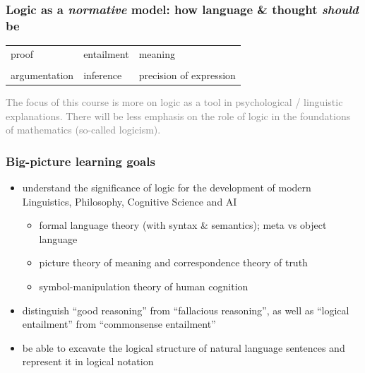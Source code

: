 \documentclass[fleqn,10pt,serif,xcolor=svgnames,xcolor=table,aspectratio=169,handout]{beamer}
\newcommand{\mygray}[1]{\textcolor{gray}{#1}}
\begin{document}
\begin{frame}
  \frametitle{Logic as a \textit{normative} model: how language \& thought \textit{should} be}

  \begin{center}
    \begin{Large}
      \begin{tabular}{C{4cm}C{4cm}C{4cm}}
        proof & entailment & meaning \\
              & \\
        argumentation & inference & precision of expression
      \end{tabular}
    \end{Large}
  \end{center}


  \bigskip

  \begin{center}
    \begin{footnotesize}
      \mygray{The focus of this course is more on logic as a tool in psychological / linguistic explanations. There will be less emphasis on the role of logic in the foundations of mathematics (so-called logicism).}
    \end{footnotesize}
  \end{center}


\end{frame}

\begin{frame}
  \frametitle{Big-picture learning goals}
  \begin{itemize}
    \item understand the significance of logic for the development of modern Linguistics, Philosophy, Cognitive Science and AI
    \begin{itemize}
      \item formal language theory (with syntax \& semantics); meta vs object language
      \item picture theory of meaning and correspondence theory of truth
      \item symbol-manipulation theory of human cognition
    \end{itemize}
    \item distinguish ``good reasoning'' from ``fallacious reasoning'', as well as ``logical entailment'' from ``commonsense entailment''
    \item be able to excavate the logical structure of natural language sentences and represent it in logical notation
  \end{itemize}
\end{frame}
\end{document}

